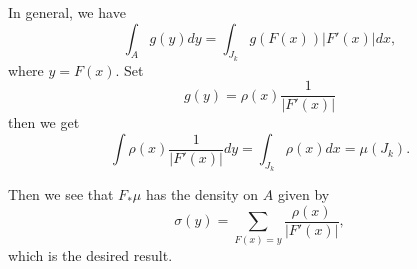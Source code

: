 \documentclass[11pt]{book}
\begin{document}
In general, we have
\begin{equation*}
  \int_A g(y)dy = \int_{J_k} g(F(x))|F'(x)| dx,
\end{equation*}
where $y = F(x)$. Set
\begin{equation*}
  g(y) = \rho(x)\frac{1}{|F'(x)|}
\end{equation*}
then we get
\begin{equation*}
  \int \rho(x)\frac{1}{|F'(x)|}dy = \int_{J_k} \rho(x)dx = \mu(J_k).
\end{equation*}

Then we see that $F_*\mu$ has the density on $A$ given by
\begin{equation*}
  \sigma(y) = \sum\limits_{F(x) = y} \frac{\rho(x)}{|F'(x)|},
\end{equation*}
which is the desired result.
\end{document}
